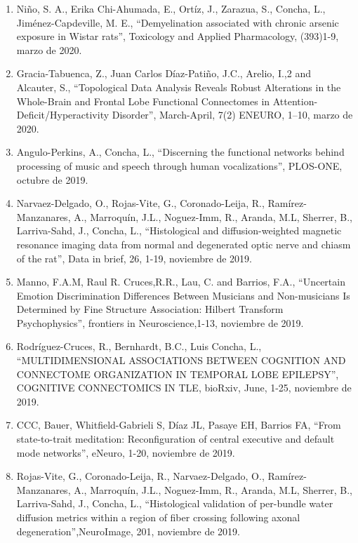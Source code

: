 \begin{enumerate}
\item Niño, S. A., Erika Chi-Ahumada, E., Ortíz, J., Zarazua, S., Concha, L., Jiménez-Capdeville, M. E., “Demyelination associated with 
chronic 
arsenic exposure in Wistar rats”, Toxicology and Applied Pharmacology, (393)1-9, marzo de 2020.

\item Gracia-Tabuenca, Z., Juan Carlos Díaz-Patiño, J.C., Arelio, I.,2 and Alcauter, S., “Topological Data Analysis Reveals Robust 
Alterations in 
the Whole-Brain and Frontal Lobe Functional Connectomes in Attention-Deficit/Hyperactivity Disorder”, March-April, 7(2) ENEURO, 1–10, marzo 
de 2020.

\item Angulo-Perkins, A., Concha, L., “Discerning the functional networks behind processing of music and speech through human vocalizations”, 
PLOS-ONE, octubre de 2019.

\item Narvaez-Delgado, O., Rojas-Vite, G., Coronado-Leija, R., Ramírez-Manzanares, A., Marroquín, J.L., Noguez-Imm, R., Aranda, M.L, Sherrer, 
B., 
Larriva-Sahd, J., Concha, L., “Histological and diffusion-weighted magnetic resonance imaging data from normal and degenerated optic nerve 
and chiasm of the rat”, Data in brief, 26, 1-19, noviembre de 2019.

\item Manno, F.A.M, Raul R. Cruces,R.R., Lau, C. and Barrios, F.A., “Uncertain Emotion Discrimination Differences Between Musicians and 
Non-musicians Is Determined by Fine Structure Association: Hilbert Transform Psychophysics”, frontiers in Neuroscience,1-13, noviembre de 
2019.

\item Rodríguez-Cruces, R., Bernhardt, B.C., Luis Concha, L., “MULTIDIMENSIONAL ASSOCIATIONS BETWEEN COGNITION AND CONNECTOME ORGANIZATION IN 
TEMPORAL LOBE EPILEPSY”, COGNITIVE CONNECTOMICS IN TLE, bioRxiv, June, 1-25, noviembre de 2019.

\item CCC, Bauer, Whitfield-Gabrieli S, Díaz JL, Pasaye EH, Barrios FA, “From state-to-trait meditation: Reconfiguration of central executive 
and 
default mode networks”, eNeuro, 1-20, noviembre de 2019.

\item Rojas-Vite, G., Coronado-Leija, R., Narvaez-Delgado, O., Ramírez-Manzanares, A., Marroquín, J.L., Noguez-Imm, R., Aranda, M.L, Sherrer, 
B., 
Larriva-Sahd, J., Concha, L., “Histological validation of per-bundle water diffusion metrics within a region of fiber crossing following 
axonal degeneration”,NeuroImage, 201, noviembre de 2019.


\end{enumerate}
